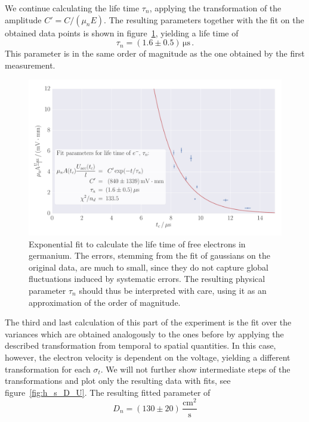 We continue calculating the life time $\tau_n$, applying the 
transformation of the amplitude $C' = C / (\mu_n E)$. The resulting 
parameters together with the fit on the obtained data points is shown 
in figure~\ref{fig:h_s_tau_U}, yielding a life time of 
\begin{equation}
    \tau_n = (1.6 \pm 0.5)\, \mathrm{\mu s} \, .
\end{equation}
This parameter is in the same order of magnitude as the one obtained 
by the first measurement. 
\begin{figure}
    \includegraphics[width=1.0\textwidth]{figures/haynes_shockley_tau_U}
    \caption{
        Exponential fit to calculate the life time of free electrons in germanium. 
        The errors, stemming from the fit of gaussians on the original data, 
        are much to small, since they do not capture global fluctuations induced 
        by systematic errors. The resulting physical parameter $\tau_n$ should 
        thus be interpreted with care, using it as an approximation of the 
        order of magnitude. 
        }
    \label{fig:h_s_tau_U}
\end{figure}
The third and last calculation of this part of the experiment is the fit over the 
variances which are obtained analogously to the ones before by applying the 
described transformation from temporal to spatial quantities. 
In this case, however, the electron velocity is dependent on 
the voltage, yielding a different transformation for each $\sigma_t$. 
We will not further show intermediate steps of the transformations and 
plot only the resulting data with fits, see figure~\ref{fig:h_s_D_U}. 
The resulting fitted parameter of 
\begin{equation}
    D_n = (130 \pm 20)\, \mathrm{\frac{cm^2}{s}} 
\end{equation}
